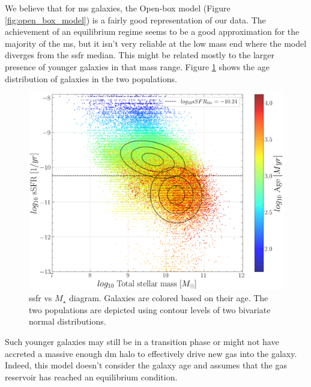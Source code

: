 \documentclass[fleqn, usenatbib]{mnras}
\begin{document}
We believe that for \acrshort{ms} galaxies, the Open-box model (Figure \ref{fig:open_box_model}) is a fairly good representation of our data. The achievement of an equilibrium regime seems to be a good approximation for the majority of the \acrlong{ms}, but it isn't very reliable at the low mass end where the model diverges from the \acrshort{ssfr} median. This might be related mostly to the larger presence of younger galaxies in that mass range. Figure \ref{fig:ssfr_vs_mass_vs_age} shows the age distribution of galaxies in the two populations.
\begin{figure}
	\includegraphics[width=\columnwidth]{images/sSFR_vs_mass_age_colormap.png}
	\caption{\acrshort{ssfr} vs \(M_{\star}\) diagram. Galaxies are colored based on their age. The two populations are depicted using contour levels of two bivariate normal distributions.}
	\label{fig:ssfr_vs_mass_vs_age}
\end{figure}
Such younger galaxies may still be in a transition phase or might not have accreted a massive enough \acrshort{dm} halo to effectively drive new gas into the galaxy. Indeed, this model doesn't consider the galaxy age and assumes that the gas reservoir has reached an equilibrium condition.
\end{document}
